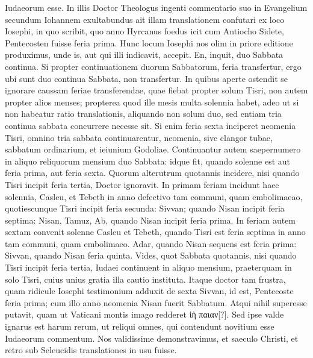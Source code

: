 Iudaeorum esse.
In illis Doctor Theologus ingenti commentario
suo in Evangelium secundum Iohannem exultabundus ait illam
translationem confutari ex loco Iosephi, in quo scribit, quo anno
Hyrcanus foedus icit cum Antiocho Sidete, Pentecosten fuisse feria
prima.
Hunc locum Iosephi nos olim in priore editione produximus,
unde is, aut qui illi indicavit, accepit.
En, inquit, duo Sabbata continua.
Si propter continuationem duorum Sabbatorum, feria transfertur,
ergo ubi sunt duo continua Sabbata, non transfertur. 
In quibus
aperte ostendit se ignorare caussam feriae transferendae, quae fiebat
propter solum Tisri, non autem propter alios menses; propterea
quod ille mesis multa solennia habet, adeo ut si non habeatur
ratio translationis, aliquando non solum duo, sed entiam tria continua
sabbata concurrere necesse sit.
Si enim feria sexta inciperet
neomenia Tisri, omnino tria sabbata continuarentur, neomenia,
sive clangor tubae, sabbatum ordinarium, et ieiunium Godoliae.
%
Continuantur autem saepernumero in aliquo reliquorum mensium
duo Sabbata: idque fit, quando solenne est aut feria prima, aut feria
sexta.
Quorum alterutrum quotannis incidere, nisi quando Tisri
incipit feria tertia, Doctor ignoravit.
In primam feriam incidunt
haec solennia,  Casleu, et  Tebeth in anno defectivo tam
communi, quam embolimaeao, quotiescunque Tisri incipit feria secunda:
 Sivvan; quando Nisan incipit feria septima:
 Nisan,  Tamuz,
 Ab, quando Nisan incipit feria prima.
In feriam autem sextam
convenit solenne  Casleu et
  Tebeth, quando Tisri est feria
septima in anno tam communi, quam embolimaeo.
 Adar, quando
Nisan sequens est feria prima:  Sivvan, quando Nisan feria quinta.
Vides, quot Sabbata quotannis, nisi quando Tisri incipit
 feria tertia, Iudaei
continuent in aliquo mensium, praeterquam in solo Tisri, cuius
unius gratia illa cautio instituta.
Itaque doctor tam frustra, quam ridicule
Iosephi testimonium adduxit de sexta Sivvan, id est, Pentecoste
feria prima; cum illo anno neomenia Nisan fuerit Sabbatum.
Atqui
nihil superesse putavit, quam ut Vaticani montis imago redderet
\textgreek{ἰὴ παιαν[?]}.
Sed ipse valde ignarus est harum rerum, ut reliqui omnes,
qui contendunt novitium esse Iudaeorum commentum.
Nos
validissime demonstravimus, et saeculo Christi, et retro sub Seleucidis
translationes in usu fuisse.
